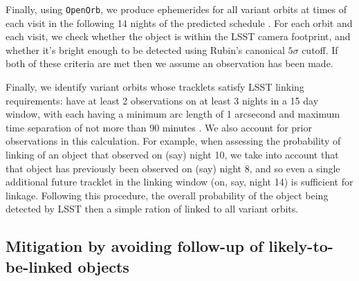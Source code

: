 \documentclass[twocolumn]{aastex631}
\begin{document}
Finally, using \texttt{OpenOrb}, we produce ephemerides for all variant orbits at times of each visit in the following 14 nights of the predicted schedule \citep{Granvik+2009}. For each orbit and each visit, we check whether the object is within the LSST camera footprint, and whether it's bright enough to be detected using Rubin's canonical $5\sigma$ cutoff.
If both of these criteria are met then we assume an observation has been made. %

Finally, we identify variant orbits whose tracklets satisfy LSST linking requirements: have at least 2 observations on at least 3 nights in a 15 day window, with each having a minimum arc length of 1 arcsecond and maximum time separation of not more than 90 minutes \citep{oss}. We also account for prior observations in this calculation. For example, when assessing the probability of linking of an object that observed on (say) night 10, we take into account that that object has previously been observed on (say) night 8, and so even a single additional future tracklet in the linking window (on, say, night 14) is sufficient for linkage. Following this procedure, the overall probability of the object being detected by LSST then a simple ration of linked to all variant orbits.

\subsection{Mitigation by avoiding follow-up of likely-to-be-linked objects}\label{sec:using_alg}
\end{document}
